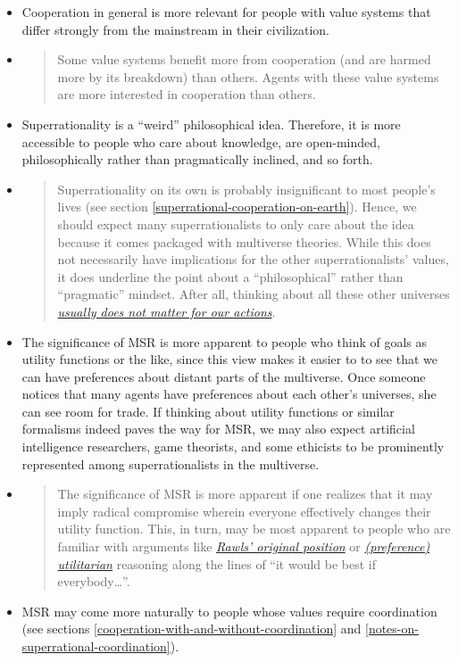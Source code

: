 \begin{itemize}
\item
  Cooperation in general is more relevant for people with value systems
  that differ strongly from the mainstream in their civilization.
\item
  \begin{quote}
  Some value systems benefit more from cooperation (and are harmed more
  by its breakdown) than others. Agents with these value systems are
  more interested in cooperation than others.
  \end{quote}
\item
  Superrationality is a ``weird'' philosophical idea. Therefore, it is
  more accessible to people who care about knowledge, are open-minded,
  philosophically rather than pragmatically inclined, and so forth.
\item
  \begin{quote}
  Superrationality on its own is probably insignificant to most people's
  lives (see section
  \ref{superrational-cooperation-on-earth}). Hence, we should expect many
  superrationalists to only care about the idea because it comes
  packaged with multiverse theories. While this does not necessarily
  have implications for the other superrationalists' values, it does
  underline the point about a ``philosophical'' rather than
  ``pragmatic'' mindset. After all, thinking about all these other
  universes
  \href{http://lesswrong.com/lw/qz/living_in_many_worlds/}{\emph{usually
  does not matter for our actions}}.
  \end{quote}
\item
  The significance of MSR is more apparent to people who think of goals
  as utility functions or the like, since this view makes it easier to
  to see that we can have preferences about distant parts of the
  multiverse. Once someone notices that many agents have preferences
  about each other's universes, she can see room for trade. If thinking
  about utility functions or similar formalisms indeed paves the way for
  MSR, we may also expect artificial intelligence researchers, game
  theorists, and some ethicists to be prominently represented among
  superrationalists in the multiverse.
\item
  \begin{quote}
  The significance of MSR is more apparent if one realizes that it may
  imply radical compromise wherein everyone effectively changes their
  utility function. This, in turn, may be most apparent to people who
  are familiar with arguments like
  \href{https://en.wikipedia.org/wiki/Original_position}{\emph{Rawls'
  original position}} \parencite{Freeman2016-kg} or
  \href{https://en.wikipedia.org/wiki/Preference_utilitarianism}{\emph{(preference)
  utilitarian}} reasoning along the lines of ``it would be best if
  everybody\ldots{}''.
  \end{quote}
\item
  MSR may come more naturally to people whose values require
  coordination (see sections
  \ref{cooperation-with-and-without-coordination} and
  \ref{notes-on-superrational-coordination}).
\end{itemize}

